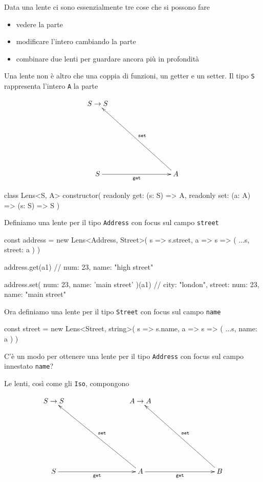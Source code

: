 \documentclass[12pt]{article}
\theoremstyle{definition}
\newenvironment{code}
  {\vspace{0.5cm} \VerbatimEnvironment\begin{typescriptcode}}
  {\end{typescriptcode} \vspace{0.2cm}}
\begin{document}
Data una lente ci sono essenzialmente tre cose che si possono fare

\begin{itemize}
  \item vedere la parte
  \item modificare l'intero cambiando la parte
  \item combinare due lenti per guardare ancora più in profondità
\end{itemize}

Una lente non è altro che una coppia di funzioni, un getter e un setter. Il tipo \texttt{S} rappresenta l'intero \texttt{A} la parte

\[
\xymatrixrowsep{3cm}
\xymatrixcolsep{3cm}
\xymatrix{
  {S \rightarrow S} \\
  S \ar[r]_{\texttt{get}} & A \ar[lu]_{\texttt{set}}
}
\]

\begin{code}
class Lens<S, A> {
  constructor(
    readonly get: (s: S) => A,
    readonly set: (a: A) => (s: S) => S
  ) {}
}
\end{code}

Definiamo una lente per il tipo \texttt{Address} con focus sul campo \texttt{street}

\begin{code}
const address = new Lens<Address, Street>(
  s => s.street,
  a => s => ({ ...s, street: a })
)

address.get(a1)
// { num: 23, name: "high street" }

address.set({ num: 23, name: 'main street' })(a1)
// { city: "london", street: { num: 23, name: "main street" } }
\end{code}

Ora definiamo una lente per il tipo \texttt{Street} con focus sul campo \texttt{name}

\begin{code}
const street = new Lens<Street, string>(
  s => s.name,
  a => s => ({ ...s, name: a })
)
\end{code}

C'è un modo per ottenere una lente per il tipo \texttt{Address} con focus sul campo innestato \texttt{name}?

Le lenti, così come gli \texttt{Iso}, compongono

\[
\xymatrixrowsep{3cm}
\xymatrixcolsep{3cm}
\xymatrix{
  {S \rightarrow S} & {A \rightarrow A} \\
  S \ar[r]_{\texttt{get}} & A \ar[lu]_{\texttt{set}} \ar[r]_{\texttt{get}} & B \ar[lu]_{\texttt{set}}
}
\]
\end{document}
